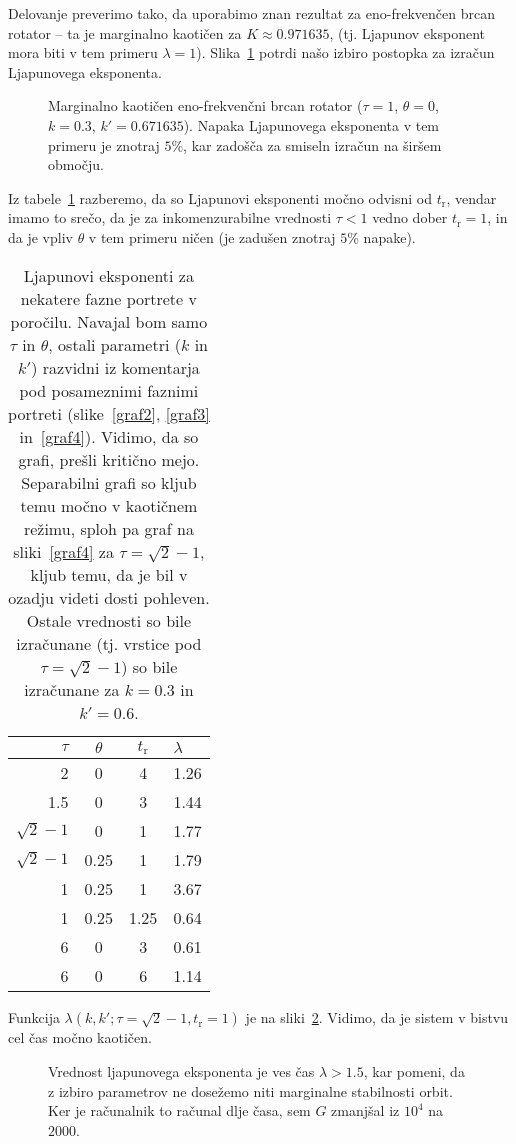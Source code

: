\documentclass[a4paper, 12pt]{article}
\begin{document}
Delovanje preverimo tako, da uporabimo znan rezultat za eno-frekven\v cen brcan rotator -- ta je marginalno kaoti\v cen za
$K \approx 0.971635$, (tj. Ljapunov eksponent mora biti v tem primeru $\lambda = 1$). Slika~\ref{deluje} potrdi na\v so
izbiro postopka za izra\v cun Ljapunovega eksponenta.
\begin{figure}[H]\centering
	
	\caption{Marginalno kaoti\v cen eno-frekven\v cni brcan rotator ($\tau = 1$, $\theta = 0$, $k = 0.3$,
		$k' = 0.671635$). Napaka Ljapunovega eksponenta v tem primeru je znotraj $5\%$, kar zado\v s\v ca za
		smiseln izra\v cun na \v sir\v sem obmo\v cju.}
	\label{deluje}
\end{figure}
Iz tabele~\ref{tab2} razberemo, da so Ljapunovi eksponenti mo\v cno odvisni od $t_\mathrm{r}$, vendar imamo to sre\v co,
da je za inkomenzurabilne vrednosti $\tau < 1$ vedno dober $t_\mathrm{r} = 1$, in da je vpliv $\theta$ v tem primeru
ni\v cen (je zadu\v sen znotraj $5\%$ napake).
\begin{table}[H]\centering
	\caption{Ljapunovi eksponenti za nekatere fazne portrete v poro\v cilu. Navajal bom samo $\tau$ in $\theta$, ostali
		parametri ($k$ in $k'$) razvidni iz komentarja pod posameznimi faznimi portreti (slike~\ref{graf2},
		\ref{graf3} in~\ref{graf4}). Vidimo, da so grafi, pre\v sli kriti\v cno mejo. Separabilni grafi so kljub
		temu mo\v cno v kaoti\v cnem re\v zimu, sploh pa graf na sliki~\ref{graf4} za $\tau = \sqrt{2}-1$, kljub
		temu, da je bil v ozadju videti dosti pohleven. Ostale vrednosti so bile izra\v cunane (tj. vrstice pod
	$\tau = \sqrt{2} - 1$) so bile izra\v cunane za $k = 0.3$ in $k' = 0.6$.}
	\begin{tabular}{r | c | c | l}
		$\tau$ & $\theta$ & $t_\mathrm{r}$ & $\lambda$ \\
		\hline \hline
		2 & 0 & 4 & 1.26 \\
		1.5 & 0 & 3 & 1.44 \\
		\hline
		$\sqrt{2}-1$ & 0 & 1 & 1.77 \\
		$\sqrt{2}-1$ & 0.25 & 1 & 1.79 \\
		\hline
		1 & 0.25 & 1 & 3.67 \\
		1 & 0.25 & 1.25 & 0.64 \\
		\hline
		6 & 0 & 3 & 0.61 \\
		6 & 0 & 6 & 1.14
	\end{tabular}
	\label{tab2}
\end{table}
Funkcija $\lambda (k, k'; \tau = \sqrt{2}-1, t_\mathrm{r} = 1)$ je na sliki~\ref{ljapun}. Vidimo, da je sistem v bistvu cel
\v cas mo\v cno kaoti\v cen.
\begin{figure}[H]\centering
	
	\caption{Vrednost ljapunovega eksponenta je ves \v cas $\lambda > 1.5$, kar pomeni, da z izbiro parametrov ne
		dose\v zemo niti marginalne stabilnosti orbit. Ker je ra\v cunalnik to ra\v cunal dlje \v casa, sem
		$G$ zmanj\v sal iz $10^4$ na $2000$.}
	\label{ljapun}
\end{figure}
\end{document}
